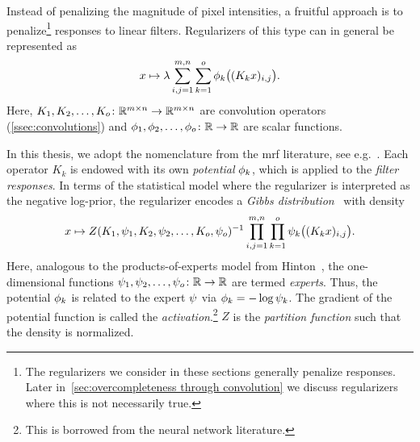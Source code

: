 Instead of penalizing the magnitude of pixel intensities, a fruitful approach is to penalize\footnote{%
	The regularizers we consider in these sections generally penalize responses.
	Later in~\cref{sec:overcompleteness through convolution} we discuss regularizers where this is not necessarily true.
} responses to linear filters.
Regularizers of this type can in general be represented as
\begin{equation}
	x \mapsto \lambda \sum_{i,j=\num{1}}^{m,n} \sum_{k=\num{1}}^{o} \phi_k\bigl((K_k x)_{i,j}\bigr).
	\label{eq:ridge regularizers}
\end{equation}
Here, \( K_{\num{1}}, K_{\num{2}}, \dotsc, K_{o} \colon \mathbb{R}^{m \times n} \to \mathbb{R}^{m \times n} \) are convolution operators (\cref{ssec:convolutions}) and \( \phi_{\num{1}}, \phi_{\num{2}}, \dotsc, \phi_{o} \colon \mathbb{R} \to \mathbb{R} \) are scalar functions.

In this thesis, we adopt the nomenclature from the \gls{mrf} literature, see e.g.~\cite{geman_stoch_84,RoBl09,zhu_minimax_1997,zhu_filters_1998}.
Each operator \( K_k \) is endowed with its own \emph{potential} \( \phi_k \), which is applied to the \emph{filter responses}.
In terms of the statistical model where the regularizer is interpreted as the negative log-prior, the regularizer encodes a \emph{Gibbs distribution}~\cite[theorem 1 and the two preceding definitions]{zhu_filters_1998} with density
\begin{equation}
	x \mapsto Z(K_{\num{1}}, \psi_{\num{1}}, K_{\num{2}},\psi_{\num{2}}, \dotsc, K_o,\psi_o)^{\num{-1}} \prod_{i,j=\num{1}}^{m, n} \prod_{k=\num{1}}^o \psi_k\bigl( (K_kx)_{i, j} \bigr).
\end{equation}
Here, analogous to the products-of-experts model from Hinton~\cite{hinton_training_2002}, the one-dimensional functions \( \psi_{\num{1}}, \psi_{\num{2}}, \dotsc, \psi_o \colon \mathbb{R} \to \mathbb{R} \) are termed \emph{experts}.
Thus, the potential \( \phi_k \) is related to the expert \( \psi \) via \( \phi_k = -\log \psi_k \).
The gradient of the potential function is called the \emph{activation}.\footnote{This is borrowed from the neural network literature.}
\( Z \) is the \emph{partition function} such that the density is normalized.

